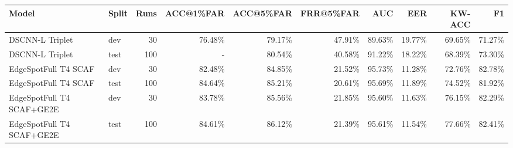 \begin{tabular}{llrrrrrrrr}
\toprule
Model & Split & Runs & ACC@1\%FAR & ACC@5\%FAR & FRR@5\%FAR & AUC & EER & KW-ACC & F1 \\
\midrule
DSCNN-L Triplet & dev & 30 & 76.48\% & 79.17\% & 47.91\% & 89.63\% & 19.77\% & 69.65\% & 71.27\% \\
DSCNN-L Triplet & test & 100 & - & 80.54\% & 40.58\% & 91.22\% & 18.22\% & 68.39\% & 73.30\% \\
EdgeSpotFull T4 SCAF & dev & 30 & 82.48\% & 84.85\% & 21.52\% & 95.73\% & 11.28\% & 72.76\% & 82.78\% \\
EdgeSpotFull T4 SCAF & test & 100 & 84.64\% & 85.21\% & 20.61\% & 95.69\% & 11.89\% & 74.52\% & 81.92\% \\
EdgeSpotFull T4 SCAF+GE2E & dev & 30 & 83.78\% & 85.56\% & 21.85\% & 95.60\% & 11.63\% & 76.15\% & 82.29\% \\
EdgeSpotFull T4 SCAF+GE2E & test & 100 & 84.61\% & 86.12\% & 21.39\% & 95.61\% & 11.54\% & 77.66\% & 82.41\% \\
\bottomrule
\end{tabular}
